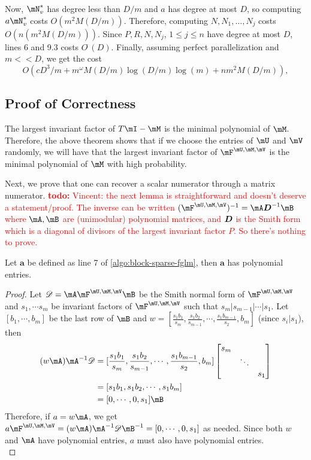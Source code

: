 \documentclass[12pt]{article}
\newcommand{\mat}[1]{\bm{\MakeUppercase{#1}}} %
\newcommand{\todo}[1]{\textcolor{red}{{\bf todo:} #1}}
\begin{document}
Now, $\mN_v^*$ has degree less than $D/m$ and $a$ has degree at most $D$, so
computing $a \mN_v^*$ costs $O(m^2M(D/m))$. Therefore, computing $N,N_1,\dots,N_j$ costs $O(n(m^2M(D/m)))$.
Since $P,R,N,N_j$, $1\le j \le n$
have degree at most $D$, lines 6 and 9.3 costs $O^{\tilde{~}}(D)$.
Finally, assuming perfect parallelization and $m << D$, we get the cost 
$$O(cD^3/m + m^{\omega} M(D/m) \log(D/m) \log(m) + nm^2M(D/m)),$$




\subsection{Proof of Correctness}


The largest invariant factor of $T\mI - \mM$ is the minimal polynomial
of $\mM$. Therefore, the above theorem shows that if we choose the
entries of $\mU$ and $\mV$ randomly, we will have that the largest
invariant factor of $\mF^{\mU,\mM,\mV}$ is the minimal polynomial of $\mM $
with high probability.

Next, we prove that one can recover a scalar numerator through a matrix
numerator.  \todo{Vincent: the next lemma is straightforward and doesn't
  deserve a statement/proof. The inverse can be written $(\mF^{\mU,\mM,\mV})^{-1} =
  \mA\mat{D}^{-1}\mB$ where $\mA,\mB$ are (unimodular) polynomial matrices, and
$\mat{D}$ is the Smith form which is a diagonal of divisors of the largest
invariant factor $P$. So there's nothing to prove.}

\begin{lemma}\label{utilde}
	Let $\textbf{a}$ be defined as line 7 of \cref{algo:block-sparse-fglm}, 
	then $\textbf{a}$ has polynomial entries.
\end{lemma}

\begin{proof}
	Let $\mathscr{D} = \mA\mF^{\mU,\mM,\mV}\mB$ be the Smith normal form of $\mF^{\mU,\mM,\mV}$ and $s_1, \cdots s_m$ be
	invariant factors of $\mF^{\mU,\mM,\mV}$ such that 
	$s_m | s_{m-1} | \cdots | s_1$.
	Let $[b_1,\cdots,b_m]$ be the last row of $\mB$ and 
	$w = [\frac{s_1b_1}{s_m},\frac{s_1b_2}{s_{m-1}},\cdots,\frac{s_1b_{m-1}}{s_2},b_m]$ (since $s_i | s_1$), then
	\begin{align*}
	(w \mA) \mA^{-1} \mathscr{D} &=  [\frac{s_1b_1}{s_m},\frac{s_1b_2}{s_{m-1}},\cdots,\frac{s_1b_{m-1}}{s_2},b_m]
	\begin{bmatrix}
	s_m &        & \\
	& \ddots & \\
	&        & s_1
	\end{bmatrix}\\
	&= [s_1b_1, s_1b_2, \cdots, s_1b_m]\\
	&= [0,\cdots,0,s_1] \mB
	\end{align*}
	Therefore, if $a = w \mA$, we get
	$ a \mF^{\mU,\mM,\mV} = (w \mA) \mA^{-1} \mathscr{D} \mB^{-1} = 
	[0,\cdots,0,s_1]$ as needed. Since both $w$ and $\mA$ have polynomial
	entries, $a$ must also have polynomial entries.\\
\end{proof}
\end{document}
